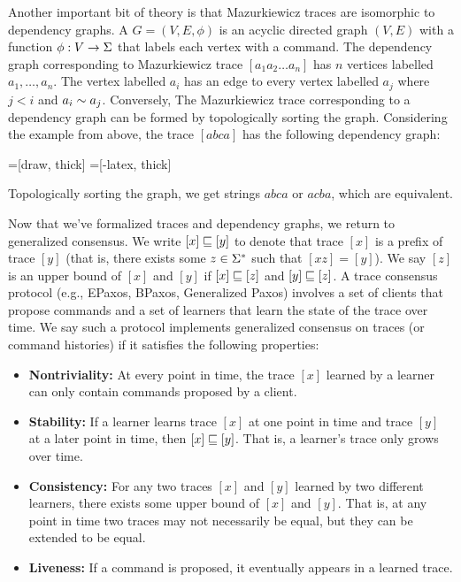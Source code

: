 Another important bit of theory is that Mazurkiewicz traces are isomorphic to
dependency graphs. A  $G = (V, E, \phi)$ is an
acyclic directed graph $(V, E)$ with a function $\phi: V \to \Sigma$ that labels
each vertex with a command. The dependency graph corresponding to Mazurkiewicz
trace $[a_1 a_2 \ldots a_n]$ has $n$ vertices labelled $a_1, \ldots, a_n$. The
vertex labelled $a_i$ has an edge to every vertex labelled $a_j$ where $j < i$
and $a_i \sim a_j$. Conversely, The Mazurkiewicz trace corresponding to a
dependency graph can be formed by topologically sorting the graph. Considering
the example from above, the trace $[abca]$ has the following dependency graph:
\begin{center}
  =[draw, thick]
  =[-latex, thick]
\end{center}
Topologically sorting the graph, we get strings $abca$ or $acba$, which
are equivalent.

Now that we've formalized traces and dependency graphs, we return to
generalized consensus. We write $[x] \sqsubseteq [y]$ to denote that trace $[x]$
is a prefix of trace $[y]$ (that is, there exists some $z \in \Sigma^*$ such that
$[xz] = [y]$).  We say $[z]$ is an upper bound of $[x]$ and $[y]$ if $[x]
\sqsubseteq [z]$ and $[y] \sqsubseteq [z]$. A trace consensus protocol (e.g.,
EPaxos, BPaxos, Generalized Paxos) involves a set of clients that propose
commands and a set of learners that learn the state of the trace over time. We
say such a protocol implements generalized consensus on traces (or command
histories) if it satisfies the following properties:
\begin{itemize}
  \item \textbf{Nontriviality:}
    At every point in time, the trace $[x]$ learned by a learner can only
    contain commands proposed by a client.

  \item \textbf{Stability:}
    If a learner learns trace $[x]$ at one point in time and trace $[y]$ at a
    later point in time, then $[x] \sqsubseteq [y]$. That is, a learner's trace
    only grows over time.

  \item \textbf{Consistency:}
    For any two traces $[x]$ and $[y]$ learned by two different learners, there
    exists some upper bound of $[x]$ and $[y]$. That is, at any point in time
    two traces may not necessarily be equal, but they can be extended to be
    equal.

  \item \textbf{Liveness:}
    If a command is proposed, it eventually appears in a learned trace.
\end{itemize}

